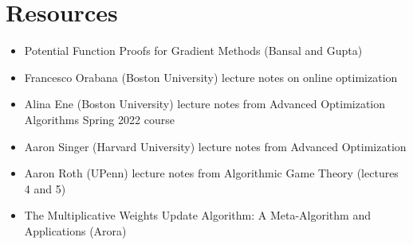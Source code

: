 \documentclass[12pt]{article}
\begin{document}
\section{Resources}
\begin{itemize}
\item Potential Function Proofs for Gradient Methods (Bansal and Gupta) 
\item Francesco Orabana (Boston University) lecture notes on online optimization
\item Alina Ene (Boston University) lecture notes from Advanced Optimization Algorithms Spring 2022 course
\item Aaron Singer (Harvard University) lecture notes from Advanced Optimization
\item Aaron Roth (UPenn) lecture notes from Algorithmic Game Theory (lectures 4 and 5)
\item The Multiplicative Weights Update Algorithm: A Meta-Algorithm and Applications (Arora)
\end{itemize}
\end{document}
